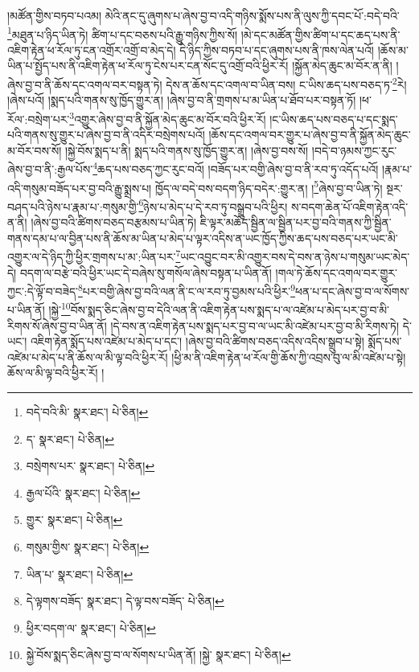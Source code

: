།མཚོན་གྱིས་བཏབ་པའམ། མེའི་ནང་དུ་ཞུགས་པ་ཞེས་བྱ་བ་འདི་གཉིས་སྨོས་པས་ནི་ལུས་ཀྱི་དབང་པོ་:བདེ་བའི་\footnote{བདེ་བའི་མི་  སྣར་ཐང་།  པེ་ཅིན། }མཐུན་པ་ཉིད་ཡིན་ཏེ། ཚིག་པ་དང་བཅས་པའི་རྒྱུ་གཉིས་ཀྱིས་སོ། །མེ་དང་མཚོན་གྱིས་ཚིག་པ་དང་ཆད་པས་ནི་འཇིག་རྟེན་ཕ་རོལ་ཏུ་ངན་འགྲོར་འགྲོ་བ་མེད་དེ། དེ་ཉིད་ཀྱིས་བཏབ་པ་དང་ཞུགས་པས་ནི་ཁས་ལེན་པའོ། །ཆོས་མ་ཡིན་པ་སྤྱོད་པས་ནི་འཇིག་རྟེན་ཕ་རོལ་ཏུ་ངེས་པར་ངན་སོང་དུ་འགྲོ་བའི་ཕྱིར་རོ། །སྐྱོན་མེད་ཆུང་མ་བོར་ན་ནི། །ཞེས་བྱ་བ་ནི་ཆོས་དང་འགལ་བར་བསྟན་ཏེ། དེས་ན་ཆོས་དང་འགལ་བ་ཡིན་བས། ང་ཡིས་ཆད་པས་བཅད་ཏ་\footnote{ད་  སྣར་ཐང་།  པེ་ཅིན། }རེ། །ཞེས་པའོ། །སྨད་པའི་གནས་སུ་ཁྱོད་གྱུར་ན། །ཞེས་བྱ་བ་ནི་གྲགས་པ་མ་ཡིན་པ་ཐོབ་པར་བསྟན་ཏོ། །ཕ་རོལ་:བསྲེག་པར་\footnote{བསྲེགས་པར་  སྣར་ཐང་།  པེ་ཅིན། }འགྱུར་ཞེས་བྱ་བ་ནི་སྐྱོན་མེད་ཆུང་མ་བོར་བའི་ཕྱིར་རོ། །ང་ཡིས་ཆད་པས་བཅད་པ་དང་སྨད་པའི་གནས་སུ་གྱུར་པ་ཞེས་བྱ་བ་ནི་འདིར་བསྲེགས་པའོ། །ཆོས་དང་འགལ་བར་གྱུར་པ་ཞེས་བྱ་བ་ནི་སྐྱོན་མེད་ཆུང་མ་བོར་བས་སོ། །སྐྱེ་བོས་སྨད་པ་ནི། སྨད་པའི་གནས་སུ་ཁྱོད་གྱུར་ན། །ཞེས་བྱ་བས་སོ། །བདེ་བ་ཉམས་ཀྱང་རུང་ཞེས་བྱ་བ་ནི་:རྒྱལ་པོས་\footnote{རྒྱལ་པོའི་  སྣར་ཐང་།  པེ་ཅིན། }ཆད་པས་བཅད་ཀྱང་རུང་བའོ། །བཟོད་པར་བགྱི་ཞེས་བྱ་བ་ནི་རབ་ཏུ་འདོད་པའོ། །རྣམ་པ་འདི་གསུམ་བཟོད་པར་བྱ་བའི་རྒྱུ་སྨྲས་པ། ཁྱོད་ལ་བདེ་བས་བདག་ཉིད་བདེར་:གྱུར་ན། །\footnote{གྱུར་  སྣར་ཐང་།  པེ་ཅིན། }ཞེས་བྱ་བ་ཡིན་ཏེ། སྔར་བཤད་པའི་ཉེས་པ་རྣམ་པ་:གསུམ་གྱི་\footnote{གསུམ་གྱིས་  སྣར་ཐང་།  པེ་ཅིན། }ཉེས་པ་མེད་པ་དེ་རབ་ཏུ་བསྒྲུབ་པའི་ཕྱིར། ས་བདག་ཆེན་པོ་འཇིག་རྟེན་འདི་ན་ནི། །ཞེས་བྱ་བའི་ཚིགས་བཅད་བརྩམས་པ་ཡིན་ཏེ། ཇི་ལྟར་མཆོད་སྦྱིན་ལ་སྦྱིན་པར་བྱ་བའི་གནས་ཀྱི་སྦྱིན་གནས་དམ་པ་ལ་བྱིན་པས་ནི་ཆོས་མ་ཡིན་པ་མེད་པ་ལྟར་འདིས་ན་ཡང་ཁྱོད་ཀྱིས་ཆད་པས་བཅད་པར་ཡང་མི་འགྱུར་ལ་དེ་ཉིད་ཀྱི་ཕྱིར་གྲགས་པ་མ་:ཡིན་པར་\footnote{ཡིན་པ་  སྣར་ཐང་།  པེ་ཅིན། }ཡང་འབྱུང་བར་མི་འགྱུར་བས་དེ་བས་ན་ཉེས་པ་གསུམ་ཡང་མེད་དེ། བདག་ལ་བརྩེ་བའི་ཕྱིར་ཡང་དེ་བཞེས་སུ་གསོལ་ཞེས་བསྟན་པ་ཡིན་ནོ། །གལ་ཏེ་ཆོས་དང་འགལ་བར་གྱུར་ཀྱང་:དེ་ལྟོ་བ་བཟེད་\footnote{དེ་ལྟགས་བཟོད་  སྣར་ཐང་། དེ་ལྟ་བས་བཟོད་  པེ་ཅིན། }པར་བགྱི་ཞེས་བྱ་བའི་ལན་ནི་ང་ལ་རབ་ཏུ་བྱམས་པའི་ཕྱིར་\footnote{ཕྱིར་བདག་ལ་  སྣར་ཐང་།  པེ་ཅིན། }ཕན་པ་དང་ཞེས་བྱ་བ་ལ་སོགས་པ་ཡིན་ནོ། །སྐྱེ་\footnote{སྐྱེ་བོས་སྨད་ཅིང་ཞེས་བྱ་བ་ལ་སོགས་པ་ཡིན་ནོ། །སྐྱེ་  སྣར་ཐང་།  པེ་ཅིན། }བོས་སྨད་ཅིང་ཞེས་བྱ་བ་དེའི་ལན་ནི་འཇིག་རྟེན་པས་སྨད་པ་ལ་འཛེམ་པ་མེད་པར་བྱ་བ་མི་རིགས་སོ་ཞེས་བྱ་བ་ཡིན་ནོ། །དེ་བས་ན་འཇིག་རྟེན་པས་སྨད་པར་བྱ་བ་ལ་ཡང་མི་འཛེམ་པར་བྱ་བ་མི་རིགས་ཏེ། དེ་ཡང་། འཇིག་རྟེན་སྨོད་པས་འཛེམ་པ་མེད་པ་དང་། །ཞེས་བྱ་བའི་ཚིགས་བཅད་འདིས་འདིས་སྒྲུབ་པ་སྟེ། སྨོད་པས་འཛེམ་པ་མེད་པ་ནི་ཆོས་ལ་མི་ལྟ་བའི་ཕྱིར་རོ། །ཕྱི་མ་ནི་འཇིག་རྟེན་ཕ་རོལ་གྱི་ཆོས་ཀྱི་འབྲས་བུ་ལ་མི་འཛེམ་པ་སྟེ། ཆོས་ལ་མི་ལྟ་བའི་ཕྱིར་རོ། །
